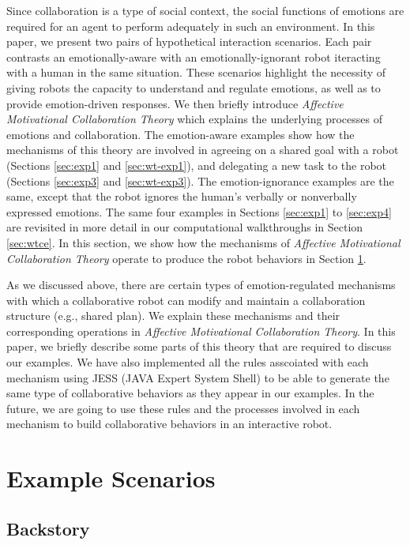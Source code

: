 Since collaboration is a type of social context, the social functions of
emotions are required for an agent to perform adequately in such an environment.
In this paper, we present two pairs of hypothetical interaction scenarios. Each
pair contrasts an emotionally-aware with an emotionally-ignorant robot
iteracting with a human in the same situation. These scenarios highlight the
necessity of giving robots the capacity to understand and regulate emotions, as
well as to provide emotion-driven responses. We then briefly introduce
\textit{Affective Motivational Collaboration Theory} which explains the
underlying processes of emotions and collaboration. The emotion-aware examples
show how the mechanisms of this theory are involved in agreeing on a shared goal
with a robot (Sections \ref{sec:exp1} and \ref{sec:wt-exp1}), and delegating a
new task to the robot (Sections \ref{sec:exp3} and \ref{sec:wt-exp3}). The
emotion-ignorance examples are the same, except that the robot ignores the
human's verbally or nonverbally expressed emotions. The same four examples in
Sections \ref{sec:exp1} to \ref{sec:exp4} are revisited in more detail in our
computational walkthroughs in Section \ref{sec:wtce}. In this section, we show
how the mechanisms of \textit{Affective Motivational Collaboration Theory}
operate to produce the robot behaviors in Section \ref{sec:example-scenario}.

As we discussed above, there are certain types of emotion-regulated mechanisms
with which a collaborative robot can modify and maintain a collaboration
structure (e.g., shared plan). We explain these mechanisms and their
corresponding operations in \textit{Affective Motivational Collaboration
Theory}. In this paper, we briefly describe some parts of this theory that are
required to discuss our examples. We have also implemented all the rules
asscoiated with each mechanism using JESS (JAVA Expert System Shell) to be able
to generate the same type of collaborative behaviors as they appear in our
examples. In the future, we are going to use these rules and the processes
involved in each mechanism to build collaborative behaviors in an interactive
robot.

\section{Example Scenarios}
\label{sec:example-scenario}

\subsection{Backstory}

